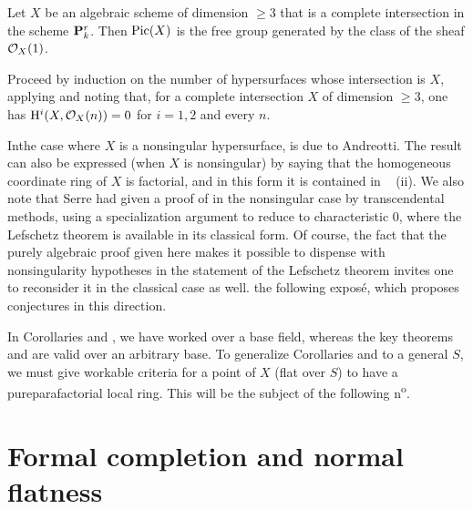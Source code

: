 \begin{corollaire} \label{XII.3.7} Let $X$ be an algebraic scheme of dimension $\geq 3$ that is a complete intersection in the scheme $\mathbf P_k^r$. Then $\operatorname{Pic}(X)$ is the free group generated by the class of the sheaf $\mathcal O_X(1)$.
\end{corollaire}
Proceed by induction on the number of hypersurfaces whose intersection is $X$, applying  and noting that, for a complete intersection $X$ of dimension $\geq 3$, one has $\mathrm H^i(X, \mathcal O_X(n))=0$ for $i=1,2$ and every $n$.

\begin{remarque} \label{XII.3.8}
In\pageoriginale the case where $X$ is a nonsingular hypersurface,  is due to Andreotti. The result  can also be expressed (when $X$ is nonsingular) by saying that the homogeneous coordinate ring of $X$ is factorial, and in this form it is contained in ~ (ii). We also note that Serre had given a proof of  in the nonsingular case by transcendental methods, using a specialization argument to reduce to characteristic 0, where the Lefschetz theorem is available in its classical form. Of course, the fact that the purely algebraic proof given here makes it possible to dispense with nonsingularity hypotheses in the statement of the Lefschetz theorem invites one to reconsider it in the classical case as well. \Cf the following expos\'e, which proposes conjectures in this direction.

In Corollaries  and , we have worked over a base field, whereas the key theorems  and  are valid over an arbitrary base. To generalize Corollaries  and  to a general $S$, we must give workable criteria for a point of $X$ (flat over $S$) to have a \og pure\fg \resp parafactorial local ring. This will be the subject of the following n\textsuperscript{o}.
\end{remarque}

\section{Formal completion and normal flatness} \label{XII.4}

\setcounter{equation}{18}

